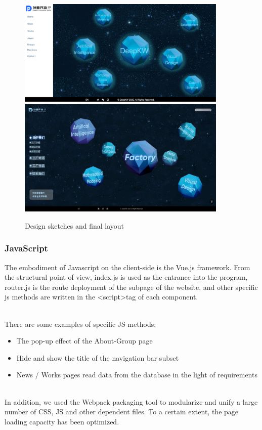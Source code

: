 \documentclass{article}
\begin{document}
\begin{figure}[h]
    \centering
    \includegraphics[width=10cm]{img/exp/css.png}
    \includegraphics[width=10cm]{img/05.jpg}
    \caption{Design sketches and final layout}
    \label{}
\end{figure}

\subsubsection{JavaScript}
The embodiment of Javascript on the client-side is the Vue.js framework. 
From the structural point of view, index.js is used as the entrance 
into the program, router.js is the route deployment of the subpage 
of the website, and other specific js methods are written in 
the \textless script\textgreater\space tag of each component.

~\\
\noindent
There are some examples of specific JS methods:
\begin{itemize}
    \item The pop-up effect of the About-Group page
    \item Hide and show the title of the navigation bar subset
    \item News / Works pages read data from the database in the light of requirements
\end{itemize}

~\\
\noindent
In addition, we used the Webpack packaging tool to modularize and 
unify a large number of CSS, JS and other dependent files. To a certain 
extent, the page loading capacity has been optimized.
\end{document}
